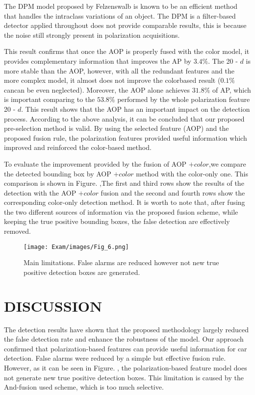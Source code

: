 \documentclass[10pt,twocolumn,letterpaper]{article}
\begin{document}
The DPM model proposed by Felzenswalb \cite{_2_} is known to be
an efficient method that handles the intraclass variations of an
object. The DPM is a filter-based detector applied throughout does not provide comparable results, this is because the noise
still strongly present in polarization acquisitions.

This result confirms that once the AOP is properly fused
with the color model, it provides complementary information
that improves the AP by $3.4\%$. The 20 - $d$ is more stable
than the AOP, however, with all the redundant features and the
more complex model, it almost does not improve the colorbased result
($0.1\%$ cancan be even neglected). Moreover, the
AOP alone achieves $31.8\%$ of AP, which is important comparing to the
$53.8\%$ performed by the whole polarization feature 20 - $d$. This result shows that the AOP has an important impact on the detection process. According to the above
analysis, it can be concluded that our proposed pre-selection
method is valid. By using the selected feature (AOP) and the
proposed fusion rule, the polarization features provided useful
information which improved and reinforced the color-based
method.

To evaluate the improvement provided by the fusion of
AOP $+ color$,we compare the detected bounding box by
AOP $+ color$ method with the color-only one. This comparison is shown in Figure. ,The first and third rows show the
results of the detection with the AOP $+ color$ fusion and the
second and fourth rows show the corresponding color-only
detection method. It is worth to note that, after fusing the
two different sources of information via the proposed fusion
scheme, while keeping the true positive bounding boxes, the
false detection are effectively removed.


\begin{figure}
    \centering
        \texttt{[image: Exam/images/Fig\_6.png]} 
    \caption{ Main limitations. False alarms are reduced however
            not new true positive detection boxes are generated.}
    \label{fig:fig_6}
\end{figure}

\section{DISCUSSION}

The detection results have shown that the proposed methodology
largely reduced the false detection rate and enhance
the robustness of the model. Our approach confirmed that
polarization-based features can provide useful information for
car detection. False alarms were reduced by a simple but effective
fusion rule. However, as it can be seen in Figure. ,
the polarization-based feature model does not generate new
true positive detection boxes. This limitation is caused by the
And-fusion used scheme, which is too much selective.
\end{document}
